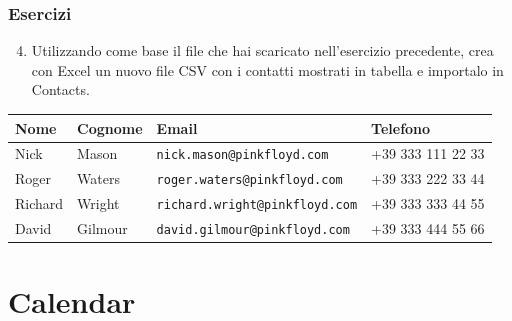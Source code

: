 \documentclass[]{beamer}
\begin{document}
\begin{frame}
\frametitle{Esercizi}
\begin{enumerate}\setcounter{enumi}{3}
  \item Utilizzando come base il file che hai scaricato nell'esercizio precedente, crea con Excel un nuovo file CSV con i contatti mostrati in tabella e importalo in Contacts.
\end{enumerate}
\begin{table}[]\def\arraystretch{1.5}\footnotesize
  \begin{tabular}{|l|l|l|l|}\hline
  \textbf{Nome} & \textbf{Cognome} & \textbf{Email}               & \textbf{Telefono} \\\hline
  Nick          & Mason            & \texttt{nick.mason@pinkfloyd.com}     & +39 333 111 22 33 \\\hline
  Roger         & Waters           & \texttt{roger.waters@pinkfloyd.com}   & +39 333 222 33 44 \\\hline
  Richard       & Wright           & \texttt{richard.wright@pinkfloyd.com} & +39 333 333 44 55 \\\hline
  David         & Gilmour          & \texttt{david.gilmour@pinkfloyd.com}  & +39 333 444 55 66 \\\hline
  \end{tabular}
\end{table}
\end{frame}


\section{Calendar}
\end{document}
